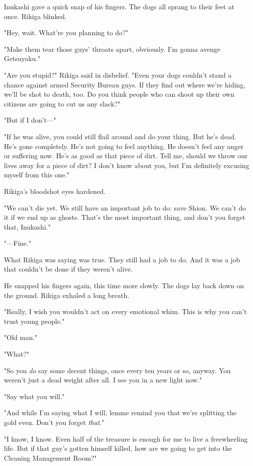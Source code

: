 Inukashi gave a quick snap of his fingers. The dogs all sprang to their
feet at once. Rikiga blinked.

"Hey, wait. What're you planning to do?"

"Make them tear those guys' throats apart, obviously. I'm gonna avenge
Getsuyaku."

"Are you stupid?" Rikiga said in disbelief. "Even your dogs couldn't
stand a chance against armed Security Bureau guys. If they find out
where we're hiding, we'll be shot to death, too. Do you think people who
can shoot up their own citizens are going to cut us any slack?"

"But if I don't---"

"If he was alive, you could still flail around and do your thing. But
he's dead. He's gone completely. He's not going to feel anything. He
doesn't feel any anger or suffering now. He's as good as that piece of
dirt. Tell me, should we throw our lives away for a piece of dirt? I
don't know about you, but I'm definitely excusing myself from this one."

Rikiga's bloodshot eyes hardened.

"We can't die yet. We still have an important job to do: save Shion. We
can't do it if we end up as ghosts. That's the most important thing, and
don't you forget that, Inukashi."

"---Fine."

What Rikiga was saying was true. They still had a job to do. And it was
a job that couldn't be done if they weren't alive.

He snapped his fingers again, this time more slowly. The dogs lay back
down on the ground. Rikiga exhaled a long breath.

"Really, I wish you wouldn't act on every emotional whim. This is why
you can't trust young people."

"Old man."

"What?"

"So you \emph{do} say some decent things, once every ten years or so, anyway.
You weren't just a dead weight after all. I see you in a new light now."

"Say what you will."

"And while I'm saying what I will, lemme remind you that we're splitting
the gold even. Don't you forget \emph{that}."

"I know, I know. Even half of the treasure is enough for me to live a
freewheeling life. But if that guy's gotten himself killed, how are we
going to get into the Cleaning Management Room?"

